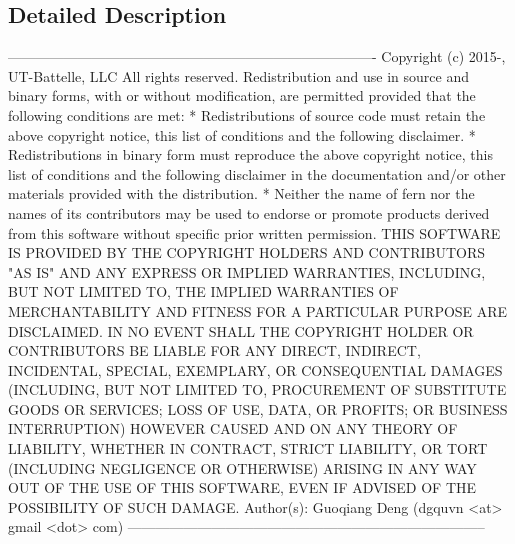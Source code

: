 \subsection{Detailed Description}
\begin{DoxyVerb}-------------------------------------------------------------------------------
 Copyright (c) 2015-, UT-Battelle, LLC
 All rights reserved.
 Redistribution and use in source and binary forms, with or without
 modification, are permitted provided that the following conditions are met:
 * Redistributions of source code must retain the above copyright notice, this
 list of conditions and the following disclaimer.
 * Redistributions in binary form must reproduce the above copyright notice,
 this list of conditions and the following disclaimer in the documentation
 and/or other materials provided with the distribution.
 * Neither the name of fern nor the names of its
 contributors may be used to endorse or promote products derived from
 this software without specific prior written permission.
 THIS SOFTWARE IS PROVIDED BY THE COPYRIGHT HOLDERS AND CONTRIBUTORS "AS IS"
 AND ANY EXPRESS OR IMPLIED WARRANTIES, INCLUDING, BUT NOT LIMITED TO, THE
 IMPLIED WARRANTIES OF MERCHANTABILITY AND FITNESS FOR A PARTICULAR PURPOSE ARE
 DISCLAIMED. IN NO EVENT SHALL THE COPYRIGHT HOLDER OR CONTRIBUTORS BE LIABLE
 FOR ANY DIRECT, INDIRECT, INCIDENTAL, SPECIAL, EXEMPLARY, OR CONSEQUENTIAL
 DAMAGES (INCLUDING, BUT NOT LIMITED TO, PROCUREMENT OF SUBSTITUTE GOODS OR
 SERVICES; LOSS OF USE, DATA, OR PROFITS; OR BUSINESS INTERRUPTION) HOWEVER
 CAUSED AND ON ANY THEORY OF LIABILITY, WHETHER IN CONTRACT, STRICT LIABILITY,
 OR TORT (INCLUDING NEGLIGENCE OR OTHERWISE) ARISING IN ANY WAY OUT OF THE USE
 OF THIS SOFTWARE, EVEN IF ADVISED OF THE POSSIBILITY OF SUCH DAMAGE.
 Author(s): Guoqiang Deng (dgquvn <at> gmail <dot> com)
 -----------------------------------------------------------------------------\end{DoxyVerb}
 